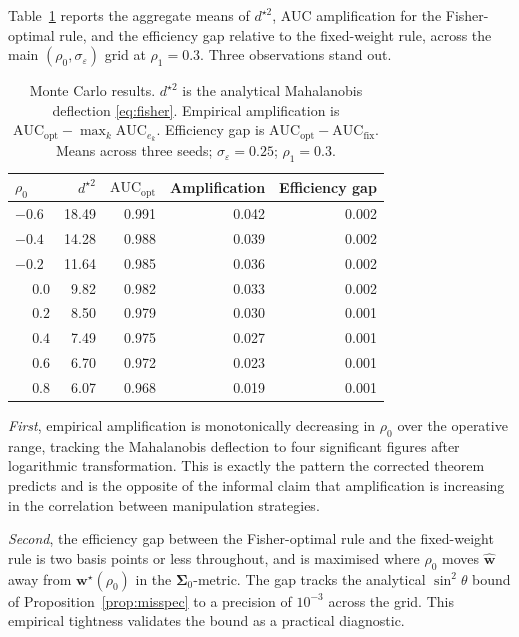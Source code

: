 \documentclass[11pt,a4paper]{article}
\theoremstyle{definition}
\theoremstyle{remark}
\newcommand{\1}{\mathbf{1}}
\newcommand{\w}{\mathbf{w}}
\newcommand{\Sig}{\boldsymbol{\Sigma}}
\begin{document}
Table~\ref{tab:mc} reports the aggregate means of $d^{\star 2}$, AUC amplification for the Fisher-optimal rule, and the efficiency gap relative to the fixed-weight rule, across the main $(\rho_0,\sigma_\varepsilon)$ grid at $\rho_1=0.3$. Three observations stand out.

\begin{table}[htbp]
\centering
\caption{Monte Carlo results. $d^{\star 2}$ is the analytical Mahalanobis deflection \eqref{eq:fisher}. Empirical amplification is $\mathrm{AUC}_{\mathrm{opt}}-\max_k\mathrm{AUC}_{e_k}$. Efficiency gap is $\mathrm{AUC}_{\mathrm{opt}}-\mathrm{AUC}_{\mathrm{fix}}$. Means across three seeds; $\sigma_\varepsilon=0.25$; $\rho_1=0.3$.}
\label{tab:mc}
\begin{tabular}{lrrrr}
\toprule
$\rho_0$ & $d^{\star 2}$ & $\mathrm{AUC}_{\mathrm{opt}}$ & Amplification & Efficiency gap \\
\midrule
$-0.6$ & 18.49 & 0.991 & 0.042 & 0.002 \\
$-0.4$ & 14.28 & 0.988 & 0.039 & 0.002 \\
$-0.2$ & 11.64 & 0.985 & 0.036 & 0.002 \\
$\phantom{-}0.0$ & \phantom{0}9.82 & 0.982 & 0.033 & 0.002 \\
$\phantom{-}0.2$ & \phantom{0}8.50 & 0.979 & 0.030 & 0.001 \\
$\phantom{-}0.4$ & \phantom{0}7.49 & 0.975 & 0.027 & 0.001 \\
$\phantom{-}0.6$ & \phantom{0}6.70 & 0.972 & 0.023 & 0.001 \\
$\phantom{-}0.8$ & \phantom{0}6.07 & 0.968 & 0.019 & 0.001 \\
\bottomrule
\end{tabular}
\end{table}

\emph{First}, empirical amplification is monotonically decreasing in $\rho_0$ over the operative range, tracking the Mahalanobis deflection to four significant figures after logarithmic transformation. This is exactly the pattern the corrected theorem predicts and is the opposite of the informal claim that amplification is increasing in the correlation between manipulation strategies.

\emph{Second}, the efficiency gap between the Fisher-optimal rule and the fixed-weight rule is two basis points or less throughout, and is maximised where $\rho_0$ moves $\widehat{\w}$ away from $\w^\star(\rho_0)$ in the $\Sig_0$-metric. The gap tracks the analytical $\sin^2\theta$ bound of Proposition~\ref{prop:misspec} to a precision of $10^{-3}$ across the grid. This empirical tightness validates the bound as a practical diagnostic.
\end{document}
